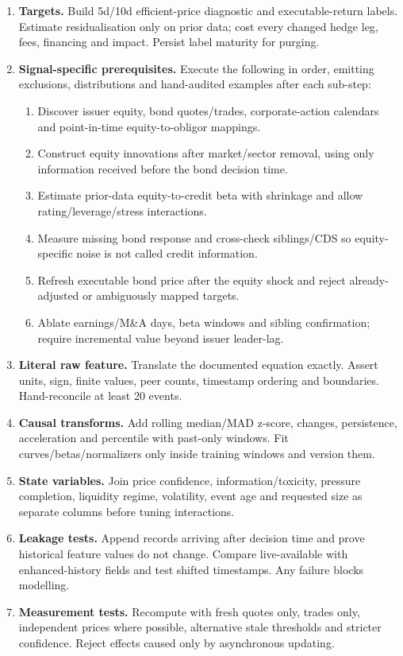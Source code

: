 \documentclass[10pt]{article}
\begin{document}
\begin{enumerate}[leftmargin=2em,label=\textbf{A\arabic*.}]
\item \textbf{Targets.} Build 5d/10d efficient-price diagnostic and executable-return labels. Estimate residualisation only on prior data; cost every changed hedge leg, fees, financing and impact. Persist label maturity for purging.
\item \textbf{Signal-specific prerequisites.} Execute the following in order, emitting exclusions, distributions and hand-audited examples after each sub-step:
\begin{enumerate}[label=\alph*)]
\item Discover issuer equity, bond quotes/trades, corporate-action calendars and point-in-time equity-to-obligor mappings.
\item Construct equity innovations after market/sector removal, using only information received before the bond decision time.
\item Estimate prior-data equity-to-credit beta with shrinkage and allow rating/leverage/stress interactions.
\item Measure missing bond response and cross-check siblings/CDS so equity-specific noise is not called credit information.
\item Refresh executable bond price after the equity shock and reject already-adjusted or ambiguously mapped targets.
\item Ablate earnings/M\&A days, beta windows and sibling confirmation; require incremental value beyond issuer leader-lag.
\end{enumerate}
\item \textbf{Literal raw feature.} Translate the documented equation exactly. Assert units, sign, finite values, peer counts, timestamp ordering and boundaries. Hand-reconcile at least 20 events.
\item \textbf{Causal transforms.} Add rolling median/MAD z-score, changes, persistence, acceleration and percentile with past-only windows. Fit curves/betas/normalizers only inside training windows and version them.
\item \textbf{State variables.} Join price confidence, information/toxicity, pressure completion, liquidity regime, volatility, event age and requested size as separate columns before tuning interactions.
\item \textbf{Leakage tests.} Append records arriving after decision time and prove historical feature values do not change. Compare live-available with enhanced-history fields and test shifted timestamps. Any failure blocks modelling.
\item \textbf{Measurement tests.} Recompute with fresh quotes only, trades only, independent prices where possible, alternative stale thresholds and stricter confidence. Reject effects caused only by asynchronous updating.

\end{enumerate}
\end{document}
